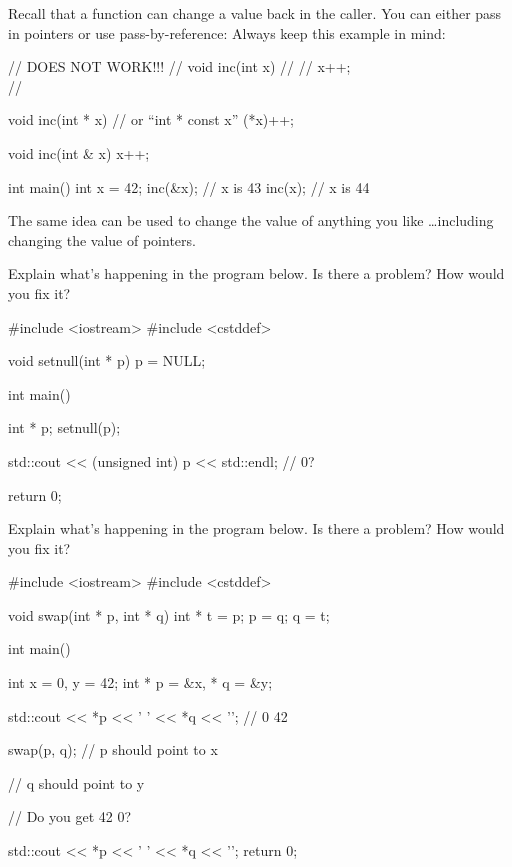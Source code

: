 \newpage{}

Recall that a function can change a value back in the caller. You can either pass in pointers or use pass-by-reference: Always keep this example in mind:

\begin{consolethree}[escapeinside=||]
// DOES NOT WORK!!!
// void inc(int x)
// {
// x++;\\
// }

void inc(int * x) // or ``int * const x''
{
    (*x)++;
}

void inc(int & x)
{
    x++;
}

int main()
{
    int x = 42;
    inc(&x);    // x is 43
    inc(x);     // x is 44
}
\end{consolethree}
The same idea can be used to change the value of anything you like \ldots including changing the value of pointers.

\begin{ex}
Explain what's happening in the program below. Is there a problem? How would you fix it?

\begin{consolethree}[escapeinside=||]
#include <iostream>
#include <cstddef>

void setnull(int * p)
{
    p = NULL;
}

int main()
{
    int * p;
    setnull(p);

    std::cout << (unsigned int) p << std::endl; // 0?

    return 0;
}
\end{consolethree}
\end{ex}

\begin{ex}
Explain what's happening in the program below. Is there a problem? How would you fix it?

\begin{consolethree}[escapeinside=||]
#include <iostream>
#include <cstddef>

void swap(int * p, int * q)
{
    int * t = p;
    p = q;
    q = t;
}

int main()
{
    int x = 0, y = 42;
    int * p = &x, * q = &y;

    std::cout << *p << ' ' << *q << '\n'; // 0 42

    swap(p, q); // p should point to x

                // q should point to y

                // Do you get 42 0?

    std::cout << *p << ' ' << *q << '\n';
    return 0;
}
\end{consolethree}
\end{ex}

